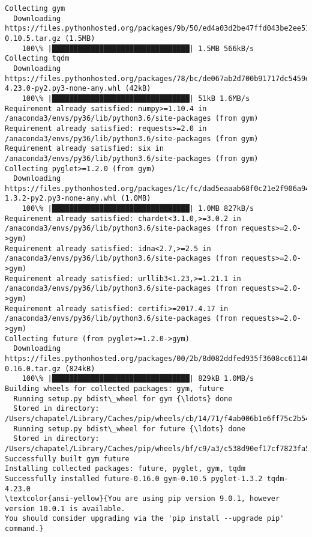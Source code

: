 \documentclass[11pt]{article}
\begin{document}
    \begin{Verbatim}[commandchars=\\\{\}]
Collecting gym
  Downloading https://files.pythonhosted.org/packages/9b/50/ed4a03d2be47ffd043be2ee514f329ce45d98a30fe2d1b9c61dea5a9d861/gym-0.10.5.tar.gz (1.5MB)
    100\% |████████████████████████████████| 1.5MB 566kB/s 
Collecting tqdm
  Downloading https://files.pythonhosted.org/packages/78/bc/de067ab2d700b91717dc5459d86a1877e2df31abfb90ab01a5a5a5ce30b4/tqdm-4.23.0-py2.py3-none-any.whl (42kB)
    100\% |████████████████████████████████| 51kB 1.6MB/s 
Requirement already satisfied: numpy>=1.10.4 in /anaconda3/envs/py36/lib/python3.6/site-packages (from gym)
Requirement already satisfied: requests>=2.0 in /anaconda3/envs/py36/lib/python3.6/site-packages (from gym)
Requirement already satisfied: six in /anaconda3/envs/py36/lib/python3.6/site-packages (from gym)
Collecting pyglet>=1.2.0 (from gym)
  Downloading https://files.pythonhosted.org/packages/1c/fc/dad5eaaab68f0c21e2f906a94ddb98175662cc5a654eee404d59554ce0fa/pyglet-1.3.2-py2.py3-none-any.whl (1.0MB)
    100\% |████████████████████████████████| 1.0MB 827kB/s 
Requirement already satisfied: chardet<3.1.0,>=3.0.2 in /anaconda3/envs/py36/lib/python3.6/site-packages (from requests>=2.0->gym)
Requirement already satisfied: idna<2.7,>=2.5 in /anaconda3/envs/py36/lib/python3.6/site-packages (from requests>=2.0->gym)
Requirement already satisfied: urllib3<1.23,>=1.21.1 in /anaconda3/envs/py36/lib/python3.6/site-packages (from requests>=2.0->gym)
Requirement already satisfied: certifi>=2017.4.17 in /anaconda3/envs/py36/lib/python3.6/site-packages (from requests>=2.0->gym)
Collecting future (from pyglet>=1.2.0->gym)
  Downloading https://files.pythonhosted.org/packages/00/2b/8d082ddfed935f3608cc61140df6dcbf0edea1bc3ab52fb6c29ae3e81e85/future-0.16.0.tar.gz (824kB)
    100\% |████████████████████████████████| 829kB 1.0MB/s 
Building wheels for collected packages: gym, future
  Running setup.py bdist\_wheel for gym {\ldots} done
  Stored in directory: /Users/chapatel/Library/Caches/pip/wheels/cb/14/71/f4ab006b1e6ff75c2b54985c2f98d0644fffe9c1dddc670925
  Running setup.py bdist\_wheel for future {\ldots} done
  Stored in directory: /Users/chapatel/Library/Caches/pip/wheels/bf/c9/a3/c538d90ef17cf7823fa51fc701a7a7a910a80f6a405bf15b1a
Successfully built gym future
Installing collected packages: future, pyglet, gym, tqdm
Successfully installed future-0.16.0 gym-0.10.5 pyglet-1.3.2 tqdm-4.23.0
\textcolor{ansi-yellow}{You are using pip version 9.0.1, however version 10.0.1 is available.
You should consider upgrading via the 'pip install --upgrade pip' command.}

    \end{Verbatim}
\end{document}
